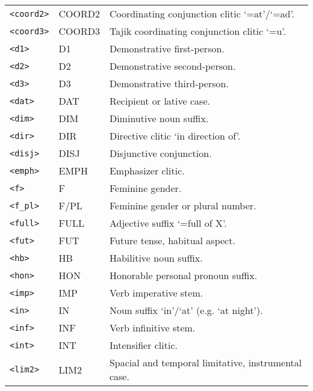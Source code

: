 \begin{table}[!h]
\begin{center}
\begin{tabular}{|p{4cm}|p{3cm}|p{8.5cm}|}
            \texttt{<coord2>} & COORD2 & Coordinating conjunction clitic `=at'/`=ad'. \\
            \texttt{<coord3>} & COORD3 & Tajik coordinating conjunction clitic `=u'.\\
            \texttt{<d1>} & D1 & Demonstrative first-person.\\
            \texttt{<d2>} & D2 & Demonstrative second-person.\\
            \texttt{<d3>} & D3 & Demonstrative third-person.\\
            \texttt{<dat>} & DAT & Recipient or lative case.\\
            \texttt{<dim>} & DIM & Diminutive noun suffix.\\
            \texttt{<dir>} & DIR & Directive clitic `in direction of'.\\
            \texttt{<disj>} & DISJ & Disjunctive conjunction. \\
            \texttt{<emph>} & EMPH & Emphasizer clitic.\\
            \texttt{<f>} & F & Feminine gender. \\
            \texttt{<f\_pl>} & F/PL & Feminine gender or plural number. \\
            \texttt{<full>} & FULL & Adjective suffix `=full of X'.\\
            \texttt{<fut>} & FUT & Future tense, habitual aspect.\\
            \texttt{<hb>} & HB & Habilitive noun suffix.\\
            \texttt{<hon>} & HON & Honorable personal pronoun suffix.\\
            \texttt{<imp>} & IMP & Verb imperative stem. \\
            \texttt{<in>} & IN & Noun suffix `in'/`at' (e.g. `at night').\\
            \texttt{<inf>} & INF & Verb infinitive stem.\\
            \texttt{<int>} & INT & Intensifier clitic.\\
            \texttt{<lim2>} & LIM2 & Spacial and temporal limitative, instrumental case.\\
            \hline
        \end{tabular}
    \end{center}
\end{table}

